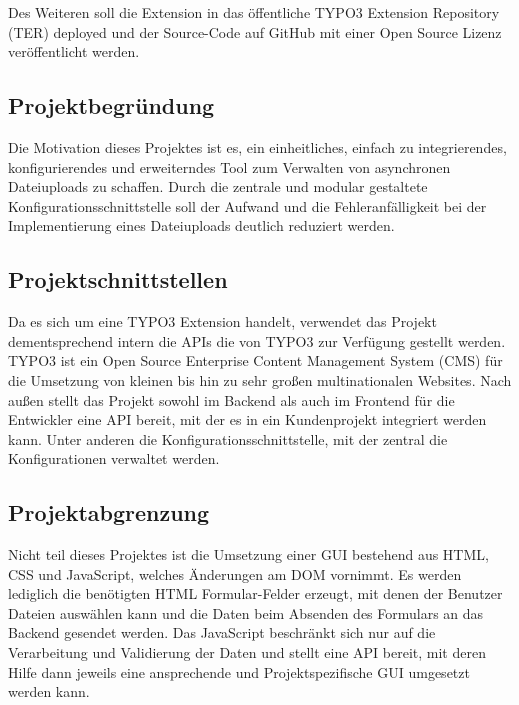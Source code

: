 Des Weiteren soll die Extension in das öffentliche TYPO3 Extension Repository (TER) deployed und der Source-Code auf GitHub mit einer Open Source Lizenz veröffentlicht werden. 


\subsection{Projektbegründung} 
\label{sec:Projektbegruendung}
Die Motivation dieses Projektes ist es, ein einheitliches, einfach zu integrierendes, konfigurierendes und erweiterndes Tool zum Verwalten von asynchronen Dateiuploads zu schaffen. Durch die zentrale und modular gestaltete Konfigurationsschnittstelle soll der Aufwand und die Fehleranfälligkeit bei der Implementierung eines Dateiuploads deutlich reduziert werden.


\subsection{Projektschnittstellen} 
\label{sec:Projektschnittstellen}
Da es sich um eine TYPO3 Extension handelt, verwendet das Projekt dementsprechend intern die APIs die von TYPO3 zur Verfügung gestellt werden. TYPO3 ist ein Open Source Enterprise Content Management System (CMS) für die Umsetzung von kleinen bis hin zu sehr großen multinationalen Websites. Nach außen stellt das Projekt sowohl im Backend als auch im Frontend für die Entwickler eine API bereit, mit der es in ein Kundenprojekt integriert werden kann. Unter anderen die Konfigurationsschnittstelle, mit der zentral die Konfigurationen verwaltet werden.


\subsection{Projektabgrenzung} 
\label{sec:Projektabgrenzung}
Nicht teil dieses Projektes ist die Umsetzung einer GUI bestehend aus HTML, CSS und JavaScript, welches Änderungen am DOM vornimmt. Es werden lediglich die benötigten HTML Formular-Felder erzeugt, mit denen der Benutzer Dateien auswählen kann und die Daten beim Absenden des Formulars an das Backend gesendet werden. Das JavaScript beschränkt sich nur auf die Verarbeitung und Validierung der Daten und stellt eine API bereit, mit deren Hilfe dann jeweils eine ansprechende und Projektspezifische GUI umgesetzt werden kann.
